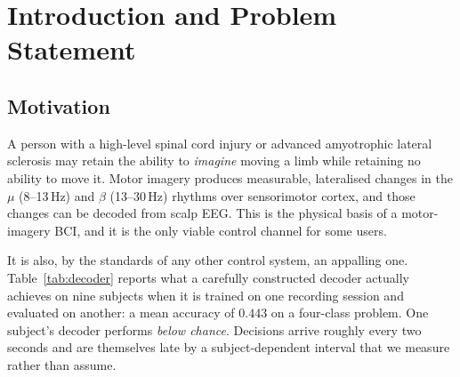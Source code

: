 \documentclass[11pt,a4paper]{article}
\theoremstyle{plain}
\theoremstyle{definition}
\begin{document}
\begin{abstract}
We report three findings against our own interest. The adaptive policy
is \emph{not} statistically better than simply ceding control to the
autonomy ($\Delta = -0.004$, 95\% CI $[-0.009,\ +0.000]$). Ablation shows that
the \emph{risk} term is what keeps the policy safe: deleting risk costs
$20$ points of success, whereas replacing the measured confidence with a
perfect oracle leaves success unchanged at its ceiling ($0.996$) and
instead doubles the authority returned to the user. And two negative
results are reported as negative: decoder errors show no burst structure
on this dataset, and a minimum-intervention safety filter is safe but
not helpful. The law is accordingly reframed as \emph{risk-gated
authority} rather than confidence-adaptive control.
\end{abstract}

\clearpage
\tableofcontents
\clearpage

\section{Introduction and Problem Statement}

\subsection{Motivation}

A person with a high-level spinal cord injury or advanced amyotrophic
lateral sclerosis may retain the ability to \emph{imagine} moving a
limb while retaining no ability to move it. Motor imagery produces
measurable, lateralised changes in the $\mu$ (8--13\,Hz) and $\beta$
(13--30\,Hz) rhythms over sensorimotor cortex, and those changes can be
decoded from scalp EEG. This is the physical basis of a motor-imagery
BCI, and it is the only viable control channel for some users.

It is also, by the standards of any other control system, an appalling
one. Table~\ref{tab:decoder} reports what a carefully constructed
decoder actually achieves on nine subjects when it is trained on one
recording session and evaluated on another: a mean accuracy of $0.443$
on a four-class problem. One subject's decoder performs \emph{below
chance}. Decisions arrive roughly every two seconds and are themselves
late by a subject-dependent interval that we measure rather than assume.
\end{document}
